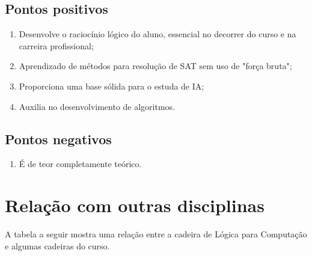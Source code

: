 \documentclass[a4paper]{article}
\begin{document}
\subsection{Pontos positivos}
\begin{enumerate}
    \item Desenvolve o raciocínio lógico do aluno, essencial no decorrer do curso e na carreira profissional;
    \item Aprendizado de métodos para resolução de SAT sem uso de "força bruta";
    \item Proporciona uma base sólida para o estuda de IA;
    \item Auxilia no desenvolvimento de algoritmos.
\end{enumerate}

\subsection{Pontos negativos}
\begin{enumerate}
    \item É de teor completamente teórico.
\end{enumerate}

\clearpage

\section{Relação com outras disciplinas}
A tabela a seguir mostra uma relação entre a cadeira de Lógica para Computação e algumas cadeiras do curso.
\end{document}
